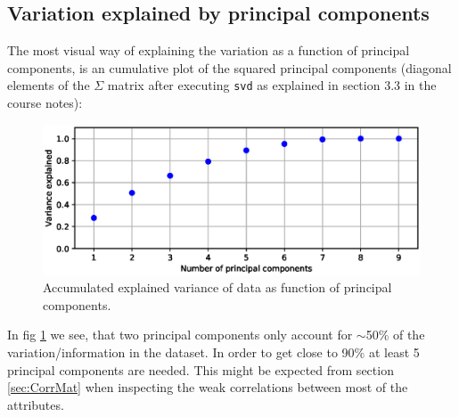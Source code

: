 \subsection{Variation explained by principal components}
\label{sec:variationExplainedPCA}

The most visual way of explaining the variation as a function of principal components, is an cumulative plot of the squared principal components (diagonal elements of the $\Sigma$ matrix after executing \texttt{svd} as explained in section 3.3 in the course notes\cite{coursenotes}):

\begin{figure}[H]
 \centering
\includegraphics[width=0.9\linewidth]{fig/RhoAkk.eps}
\caption{Accumulated explained variance of data as function of principal components.}
\label{fig:rhoakk}
\end{figure}

In fig \ref{fig:rhoakk} we see, that two principal components only account for $\sim$50\% of the variation/information in the dataset. In order to get close to 90\% at least 5 principal components are needed. This might be expected from section \ref{sec:CorrMat} when inspecting the weak correlations between most of the attributes. 